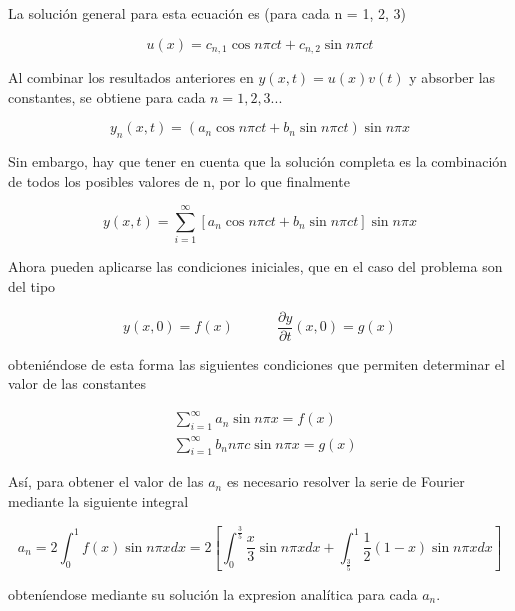 \documentclass[11pt]{article}
\begin{document}
La solución general para esta ecuación es (para cada n = 1, 2, 3)

\begin{equation}
	u(x) = c_{n,1}\cos{n\pi{c}t} + c_{n,2}\sin{n\pi{c}t}
\end{equation}

Al combinar los resultados anteriores en $y(x,t) = u(x)v(t)$ y absorber las constantes, se
obtiene para cada $n = 1, 2, 3 ...$

\begin{equation}
	y_n(x,t) = (a_n\cos{n\pi{c}t} + b_n\sin{n\pi{c}t})\sin{n\pi{x}}
\end{equation}

Sin embargo, hay que tener en cuenta que la solución completa es la combinación de todos
los posibles valores de n, por lo que finalmente

\begin{equation}
	y(x,t) = \sum\limits_{i=1}^\infty[a_n\cos{n\pi{c}t} + b_n\sin{n\pi{c}t}]\sin{n\pi{x}}
\label{eq:sol_analitica}
\end{equation}

Ahora pueden aplicarse las condiciones iniciales, que en el caso del problema son del tipo

\begin{equation}
	y(x, 0) = f(x)~~~~~~~~~~~~~~\frac{\partial{y}}{\partial{t}}(x, 0) = g(x)
\end{equation}

obteniéndose de esta forma las siguientes condiciones que permiten determinar el valor de
las constantes

\begin{subequations}
\begin{flalign}
	&\sum\limits_{i=1}^\infty a_n \sin{n\pi{x}} = f(x)\\
	&\sum\limits_{i=1}^\infty b_n n\pi{c} \sin{n\pi{x}} = g(x)
\end{flalign}
\end{subequations}

Así, para obtener el valor de las $a_n$ es necesario resolver la serie de Fourier mediante
la siguiente integral

\begin{equation}
	a_n = 2 \int_0^1 f(x) \sin{n\pi{x}}dx = 2[\int_0^\frac{3}{5} \frac{x}{3} \sin{n\pi{x}}dx
	+ \int_{\frac{3}{5}}^1 \frac{1}{2}(1-x) \sin{n\pi{x}}dx]
\end{equation}

obteníendose mediante su solución la expresion analítica para cada $a_n$.
\end{document}
